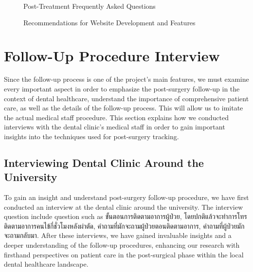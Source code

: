 \documentclass[12pt,oneside,openright,a4paper]{cpe-english-project}
\begin{document}
      \begin{figure}[!h]
        \centering
        \caption{Post-Treatment Frequently Asked Questions}\label{fig:Result_5}
      \end{figure}
      \begin{figure}[!h]
        \centering
        \caption{Recommendations for Website Development and Features}\label{fig:Result_6}
      \end{figure}
      \FloatBarrier{}

  \section{Follow-Up Procedure Interview}
    \qquad Since the follow-up process is one of the project's main features, we must examine every important aspect in order to emphasize the post-surgery follow-up in the context of dental healthcare, understand the importance of comprehensive patient care, as well as the details of the follow-up process. This will allow us to imitate the actual medical staff procedure. This section explains how we conducted interviews with the dental clinic's medical staff in order to gain important insights into the techniques used for post-surgery tracking. \par
    \subsection{Interviewing Dental Clinic Around the University}
      \qquad To gain an insight and understand post-surgery follow-up procedure, we have first conducted an interview at the dental clinic around the university. The interview question include question such as \textthai{ขั้นตอนการติดตามอาการผู้ป่วย, โดยปกติแล้วจะทำการโทรติดตามอาการคนไข้กี่ชั่วโมงหลังผ่าตัด, คำถามที่มักจะถามผู้ป่วยตอนติดตามอาการ, คำถามที่ผู้ป่วยมักจะถามกลับมา.} After these interviews, we have gained invaluable insights and a deeper understanding of the follow-up procedures, enhancing our research with firsthand perspectives on patient care in the post-surgical phase within the local dental healthcare landscape. \par
\end{document}
